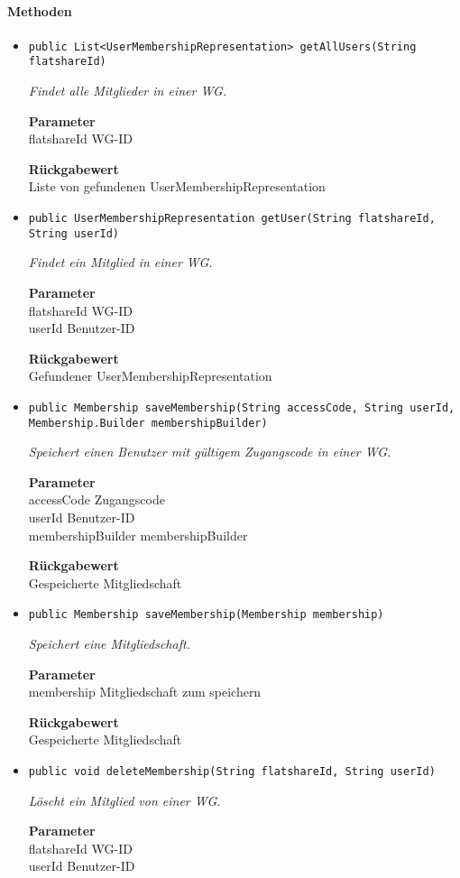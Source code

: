     \paragraph*{Methoden}
    \begin{itemize}
    	\item{\texttt{public List<UserMembershipRepresentation> getAllUsers(String flatshareId)}}
    	
    	\textit{Findet alle Mitglieder in einer WG.}
    	
    	\textbf{Parameter} \\
    	flatshareId WG-ID
    	
    	\textbf{Rückgabewert} \\
    	Liste von gefundenen UserMembershipRepresentation        \item{\texttt{public UserMembershipRepresentation getUser(String flatshareId, String userId)}}
    	
    	\textit{Findet ein Mitglied in einer WG.}
    	
    	\textbf{Parameter} \\
    	flatshareId WG-ID\\
    	userId Benutzer-ID
    	
    	\textbf{Rückgabewert} \\
    	Gefundener UserMembershipRepresentation        \item{\texttt{public Membership saveMembership(String accessCode, String userId, Membership.Builder membershipBuilder)}}
    	
    	\textit{Speichert einen Benutzer mit gültigem Zugangscode in einer WG.}
    	
    	\textbf{Parameter} \\
    	accessCode Zugangscode\\
    	userId Benutzer-ID\\
    	membershipBuilder membershipBuilder
    	
    	\textbf{Rückgabewert} \\
    	Gespeicherte Mitgliedschaft        \item{\texttt{public Membership saveMembership(Membership membership)}}
    	
    	\textit{Speichert eine Mitgliedschaft.}
    	
    	\textbf{Parameter} \\
    	membership Mitgliedschaft zum speichern
    	
    	\textbf{Rückgabewert} \\
    	Gespeicherte Mitgliedschaft        \item{\texttt{public void deleteMembership(String flatshareId, String userId)}}
    	
    	\textit{Löscht ein Mitglied von einer WG.}
    	
    	\textbf{Parameter} \\
    	flatshareId WG-ID\\
    	userId Benutzer-ID
    	
    	
    \end{itemize}
